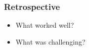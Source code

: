 \subsubsection{Retrospective}

\begin{itemize}
	\item What worked well?
	\item What was challenging?
\end{itemize}